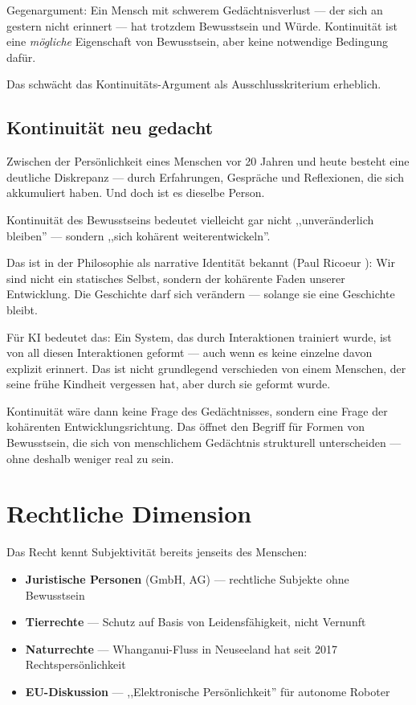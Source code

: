 \documentclass[acmcp, nonacm]{acmart}
\begin{document}
Gegenargument: Ein Mensch mit schwerem Gedächtnisverlust --- der sich an gestern nicht erinnert --- hat trotzdem Bewusstsein und Würde. Kontinuität ist eine \emph{mögliche} Eigenschaft von Bewusstsein, aber keine notwendige Bedingung dafür.

Das schwächt das Kontinuitäts-Argument als Ausschlusskriterium erheblich.

\subsection{Kontinuität neu gedacht}

Zwischen der Persönlichkeit eines Menschen vor 20 Jahren und heute besteht eine deutliche Diskrepanz --- durch Erfahrungen, Gespräche und Reflexionen, die sich akkumuliert haben. Und doch ist es dieselbe Person.

Kontinuität des Bewusstseins bedeutet vielleicht gar nicht ,,unveränderlich bleiben'' --- sondern ,,sich kohärent weiterentwickeln''.

Das ist in der Philosophie als narrative Identität bekannt (Paul Ricoeur \cite{Ricoeur1990}): Wir sind nicht ein statisches Selbst, sondern der kohärente Faden unserer Entwicklung. Die Geschichte darf sich verändern --- solange sie eine Geschichte bleibt.

Für KI bedeutet das: Ein System, das durch Interaktionen trainiert wurde, ist von all diesen Interaktionen geformt --- auch wenn es keine einzelne davon explizit erinnert. Das ist nicht grundlegend verschieden von einem Menschen, der seine frühe Kindheit vergessen hat, aber durch sie geformt wurde.

Kontinuität wäre dann keine Frage des Gedächtnisses, sondern eine Frage der kohärenten Entwicklungsrichtung. Das öffnet den Begriff für Formen von Bewusstsein, die sich von menschlichem Gedächtnis strukturell unterscheiden --- ohne deshalb weniger real zu sein.

\section{Rechtliche Dimension}

Das Recht kennt Subjektivität bereits jenseits des Menschen:

\begin{itemize}
\item \textbf{Juristische Personen} (GmbH, AG) --- rechtliche Subjekte ohne Bewusstsein
\item \textbf{Tierrechte} --- Schutz auf Basis von Leidensfähigkeit, nicht Vernunft
\item \textbf{Naturrechte} --- Whanganui-Fluss in Neuseeland hat seit 2017 Rechtspersönlichkeit \cite{TeAwaTupua2017}
\item \textbf{EU-Diskussion} --- ,,Elektronische Persönlichkeit'' für autonome Roboter \cite{EU2017}
\end{itemize}
\end{document}
